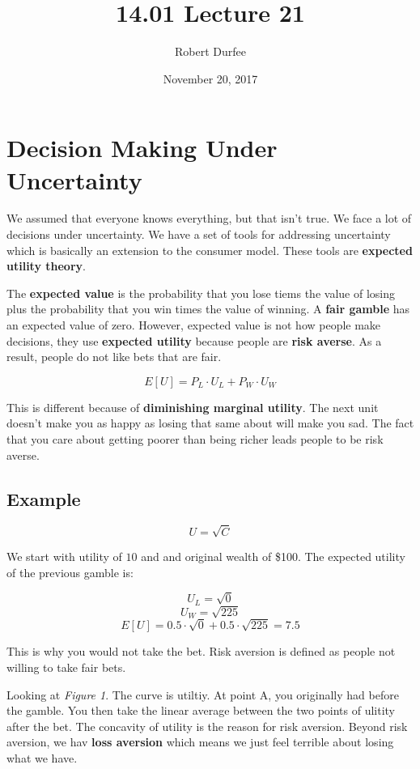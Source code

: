 \documentclass{article}
\title{ 14.01 Lecture 21 }
\author{ Robert Durfee }
\date{ November 20, 2017 }
\begin{document}
\maketitle

\section{ Decision Making Under Uncertainty }

We assumed that everyone knows everything, but that isn't true. We face a lot of
decisions under uncertainty. We have a set of tools for addressing uncertainty
which is basically an extension to the consumer model. These tools are
\textbf{expected utility theory}. 

The \textbf{expected value} is the probability that you lose tiems the value of
losing plus the probability that you win times the value of winning. A
\textbf{fair gamble} has an expected value of zero. However, expected value is
not how people make decisions, they use \textbf{expected utility} because people
are \textbf{risk averse}. As a result, people do not like bets that are fair.

$$E[U] = P_L \cdot U_L + P_W \cdot U_W$$

This is different because of \textbf{diminishing marginal utility}. The next
unit doesn't make you as happy as losing that same about will make you sad. The
fact that you care about getting poorer than being richer leads people to be
risk averse.

\subsection{Example}

$$U = \sqrt{C}$$

We start with utility of $10$ and and original wealth of \$100. The expected
utility of the previous gamble is:

$$U_L = \sqrt{0}$$
$$U_W = \sqrt{225}$$
$$E[U] = 0.5 \cdot  \sqrt{0} + 0.5 \cdot \sqrt{225} = 7.5$$

This is why you would not take the bet. Risk aversion is defined as people not
willing to take fair bets.

\bigbreak

Looking at \textit{Figure 1}. The curve is utiltiy. At point A, you originally
had before the gamble. You then take the linear average between the two points
of ulitity after the bet. The concavity of utility is the reason for risk
aversion. Beyond risk aversion, we hav \textbf{loss aversion} which means we
just feel terrible about losing what we have.
\end{document}
